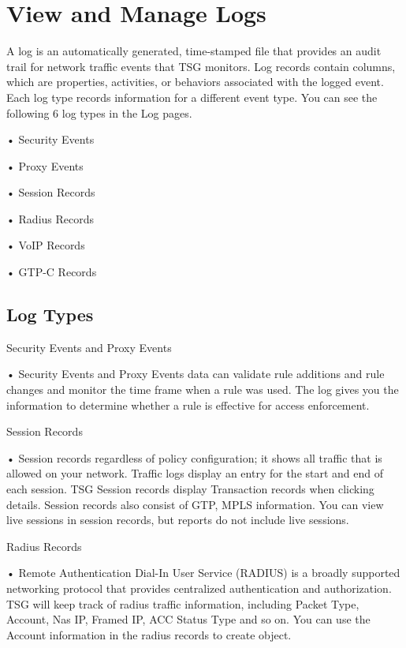 \section*{\hypertarget{link:View and Manage Logs}{View and Manage Logs}}
\label{sec:monitor:log}

A log is an automatically generated, time-stamped file that provides an audit trail for network traffic events that TSG monitors. 
Log records contain columns, which are properties, activities, or behaviors associated with the logged event. 
Each log type records information for a different event type. You can see the following 6 log types in the Log pages.


• Security Events 


• Proxy Events


• Session Records 


• Radius Records


• VoIP Records


• GTP-C Records

\subsection*{\hypertarget{link:Log Types}{Log Types}}
\label{sec:monitor:log:type}

Security Events and Proxy Events


• Security Events and Proxy Events data can validate rule additions and rule changes and monitor the time frame when a rule was used. 
The log gives you the information to determine whether a rule is effective for access enforcement.


Session Records


• Session records regardless of policy configuration; it shows all traffic that is allowed on your network. Traffic logs display an entry for the start and end of each session. 
TSG Session records display Transaction records when clicking details. Session records also consist of GTP, MPLS information. You can view live sessions in session records, but reports do not include live sessions.


Radius Records


• Remote Authentication Dial-In User Service (RADIUS) is a broadly supported networking protocol that provides centralized authentication and authorization. 
TSG will keep track of radius traffic information, including Packet Type, Account, Nas IP, Framed IP, ACC Status Type and so on. 
You can use the Account information in the radius records to create \hyperlink{link:Subscriber ID}{\color{linkblue}{Subscriber ID}} object.


